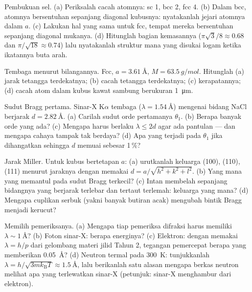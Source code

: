 \begin{exercise}[$\star$]\label{exo:b3:crystalline-solids:1}
Pembukuan sel. (a) Periksalah cacah atomnya: sc 1, bcc 2, fcc 4.
(b) Dalam bcc, atomnya bersentuhan sepanjang diagonal kubusnya:
nyatakanlah jejari atomnya dalam $a$. (c) Lakukan hal yang sama untuk fcc, tempat
mereka bersentuhan sepanjang diagonal mukanya. (d) Hitunglah bagian kemasannya
($\pi\sqrt3/8 \approx 0.68$ dan $\pi/\sqrt{18} \approx 0.74$) lalu
nyatakanlah struktur mana yang disukai logam ketika ikatannya
buta arah.
\end{exercise}

\begin{exercise}[$\star$]\label{exo:b3:crystalline-solids:2}
Tembaga menurut bilangannya. Fcc, $a = \qty{3.61}{\angstrom}$, $M =
\qty{63.5}{g/mol}$. Hitunglah (a) jarak tetangga terdekatnya;
(b) cacah tetangga terdekatnya; (c) kerapatannya; (d) cacah
atom dalam kubus kawat sambung berukuran \qty{1}{\micro m}.
\end{exercise}

\begin{exercise}[$\star$]\label{exo:b3:crystalline-solids:3}
Sudut Bragg pertama. Sinar-X K$\alpha$ tembaga
($\lambda = \qty{1.54}{\angstrom}$) mengenai bidang NaCl berjarak
$d = \qty{2.82}{\angstrom}$. (a) Carilah sudut orde pertamanya
$\theta_1$. (b) Berapa banyak orde yang ada? (c) Mengapa harus berlaku
$\lambda \le 2d$ agar ada pantulan --- dan mengapa cahaya tampak
tak berdaya? (d) Apa yang terjadi pada $\theta_1$ jika  dihangatkan
sehingga $d$ memuai sebesar 1\,\%?
\end{exercise}

\begin{exercise}[$\star$]\label{exo:b3:crystalline-solids:4}
Jarak Miller. Untuk  kubus bertetapan $a$: (a) urutkanlah
keluarga (100), (110), (111) menurut jaraknya dengan memakai
$d = a/\sqrt{h^2+k^2+l^2}$. (b) Yang mana yang memantul pada sudut
Bragg terkecil? (c) Intan membelah sepanjang bidangnya yang berjarak
terlebar dan tertaut terlemah: keluarga yang mana? (d) Mengapa cuplikan
serbuk (yakni banyak butiran acak) mengubah bintik Bragg menjadi kerucut?
\end{exercise}

\begin{exercise}[$\star\star$]\label{exo:b3:crystalline-solids:5}
Memilih pemeriksanya. (a) Mengapa tiap pemeriksa difraksi harus memiliki
$\lambda \sim \qty{1}{\angstrom}$? (b) Foton sinar-X: berapa energinya?
(c) Elektron: dengan memakai $\lambda = h/p$ dari gelombang materi jilid
Tahun 2, tegangan pemercepat berapa yang memberikan
\qty{0.05}{\angstrom}? (d) Neutron termal pada \qty{300}{K}: tunjukkanlah
$\lambda = h/\sqrt{3mk_{\text{B}}T} \approx \qty{1.5}{\angstrom}$,
lalu berikanlah satu alasan mengapa berkas neutron melihat apa yang
terlewatkan sinar-X (petunjuk: sinar-X menghambur dari elektron).
\end{exercise}

